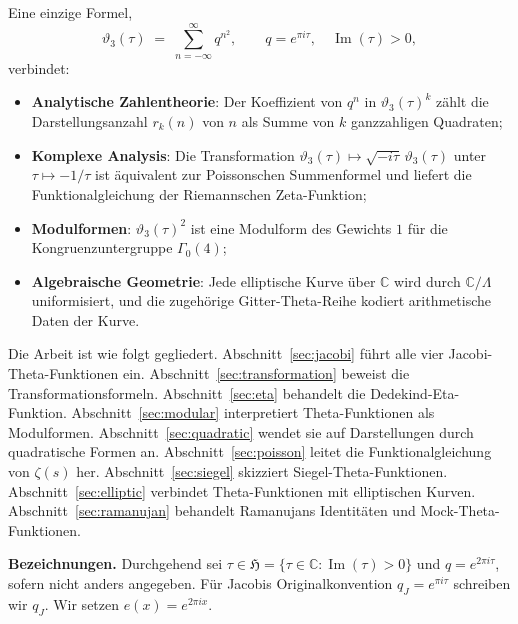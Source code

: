 \documentclass[12pt,a4paper]{amsart}
\theoremstyle{definition}
\begin{document}
Eine einzige Formel,
\begin{equation}\label{eq:theta3basic}
  \vartheta_3(\tau) \;=\; \sum_{n=-\infty}^{\infty} q^{n^2},
  \qquad q = e^{\pi i \tau},\quad \operatorname{Im}(\tau)>0,
\end{equation}
verbindet:
\begin{itemize}[leftmargin=2em]
  \item \textbf{Analytische Zahlentheorie}: Der Koeffizient von $q^n$ in
        $\vartheta_3(\tau)^k$ zählt die Darstellungsanzahl $r_k(n)$
        von $n$ als Summe von $k$ ganzzahligen Quadraten;
  \item \textbf{Komplexe Analysis}: Die Transformation
        $\vartheta_3(\tau) \mapsto \sqrt{-i\tau}\,\vartheta_3(\tau)$
        unter $\tau \mapsto -1/\tau$ ist äquivalent zur Poissonschen Summenformel
        und liefert die Funktionalgleichung der Riemannschen Zeta-Funktion;
  \item \textbf{Modulformen}: $\vartheta_3(\tau)^2$ ist eine Modulform des
        Gewichts $1$ für die Kongruenzuntergruppe $\Gamma_0(4)$;
  \item \textbf{Algebraische Geometrie}: Jede elliptische Kurve über $\mathbb{C}$
        wird durch $\mathbb{C}/\Lambda$ uniformisiert, und die zugehörige
        Gitter-Theta-Reihe kodiert arithmetische Daten der Kurve.
\end{itemize}

Die Arbeit ist wie folgt gegliedert.
Abschnitt~\ref{sec:jacobi} führt alle vier Jacobi-Theta-Funktionen ein.
Abschnitt~\ref{sec:transformation} beweist die Transformationsformeln.
Abschnitt~\ref{sec:eta} behandelt die Dedekind-Eta-Funktion.
Abschnitt~\ref{sec:modular} interpretiert Theta-Funktionen als Modulformen.
Abschnitt~\ref{sec:quadratic} wendet sie auf Darstellungen durch quadratische Formen an.
Abschnitt~\ref{sec:poisson} leitet die Funktionalgleichung von $\zeta(s)$ her.
Abschnitt~\ref{sec:siegel} skizziert Siegel-Theta-Funktionen.
Abschnitt~\ref{sec:elliptic} verbindet Theta-Funktionen mit elliptischen Kurven.
Abschnitt~\ref{sec:ramanujan} behandelt Ramanujans Identitäten und Mock-Theta-Funktionen.

\medskip
\noindent\textbf{Bezeichnungen.}
Durchgehend sei $\tau \in \mathfrak{H} = \{\tau \in \mathbb{C} : \operatorname{Im}(\tau)>0\}$
und $q = e^{2\pi i\tau}$, sofern nicht anders angegeben.
Für Jacobis Originalkonvention $q_J = e^{\pi i \tau}$ schreiben wir $q_J$.
Wir setzen $e(x) = e^{2\pi i x}$.

\end{document}
